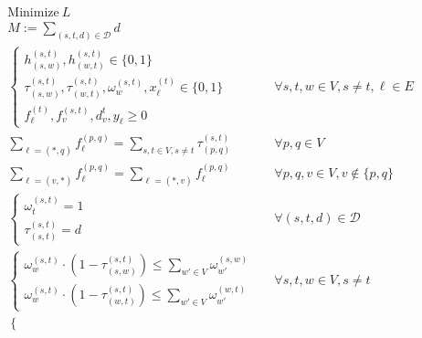 \documentclass[a4paper,USenglish]{lipics-v2018}
\begin{document}
\begin{align}
& \text{Minimize} ~L \nonumber	&&\\
&M := \sum_{ (s,t,d) \in \mathcal{D}} d &&\\
&\begin{cases}
	h^{(s,t)}_{(s,w)}, h^{(s,t)}_{(w,t)}  \in \{0,1\} \\
	\tau^{(s,t)}_{(s,w)}, \tau^{(s,t)}_{(w,t)},
	\omega^{(s,t)}_{w},
	x^{(t)}_{\ell} 
 \in \{0,1\} \\
 f^{(t)}_{\ell}, f^{(s,t)}_{v}, d^{t}_v, y_{\ell}  \geq 0
\end{cases}
&&\forall  s,t,w \in V, s \neq t, \ell \in E \label{LP:vardef}    
\\
&\sum_{\ell = (*,q)} f^{(p,q)}_{\ell} 
= \sum_{ s,t\in V, s\neq t} \tau^{(s,t)}_{(p,q)}
&& \forall p,q \in V
\label{LP:flowsink1}
 \\
 &\sum_{\ell = (v,*)} f^{(p,q)}_{\ell} = 
 \sum_{\ell = (*,v)} f^{(p,q)}_{\ell} 
 && \forall p,q,v \in V, v \not\in \{p,q\}
 \label{LP:flowcons1}
 \\
 & 
 \begin{cases}
	 \omega^{(s,t)}_{t} = 1 \\
	 \tau^{(s,t)}_{(s,t)} = d
 \end{cases}
 && \forall (s,t,d) \in \mathcal{D}
 \label{LP:wp_t}
 \\
 &
 \begin{cases*}
    \omega^{(s,t)}_{w} \cdot (1-\tau^{(s,t)}_{(s,w)}) \leq  \sum_{w' \in V} \omega^{(s,w)}_{w'}	\\
    \omega^{(s,t)}_{w} \cdot (1-\tau^{(s,t)}_{(w,t)})  \leq  \sum_{w' \in V} \omega^{(w,t)}_{w'}	    
 \end{cases*}	 
 && \forall s,t,w \in V, s\neq t
 \label{LP:segments}
  \\
 &
 \begin{cases*}

\end{cases*}
\end{align}
\end{document}
